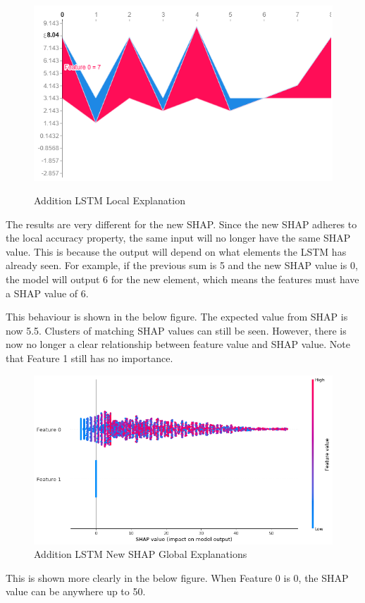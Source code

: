 \documentclass[12pt]{article}
\begin{document}
\begin{figure}[H]
\centering\caption{Addition LSTM Local Explanation}
\includegraphics[scale=0.6]{Sanity Old Local.png}
\label{Sanity Old Local}
\end{figure}

The results are very different for the new SHAP. Since the new SHAP adheres to the local accuracy property, the same input will no longer have the same SHAP value. This is because the output will depend on what elements the LSTM has already seen. For example, if the previous sum is 5 and the new SHAP value is 0, the model will output 6 for the new element, which means the features must have a SHAP value of 6.

This behaviour is shown in the below figure. The expected value from SHAP is now 5.5. Clusters of matching SHAP values can still be seen. However, there is now no longer a clear relationship between feature value and SHAP value. Note that Feature 1 still has no importance. 

\begin{figure}[H]
\centering\caption{Addition LSTM New SHAP Global Explanations}
\includegraphics[scale=0.4]{Sanity New Global.png}
\end{figure}
This is shown more clearly in the below figure. When Feature 0 is 0, the SHAP value can be anywhere up to 50. 
\end{document}
